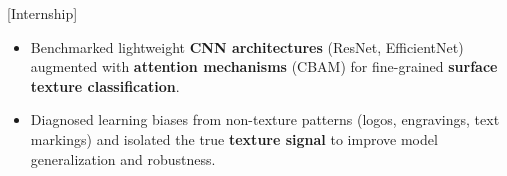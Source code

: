 [Internship]
\begin{itemize}
\item Benchmarked lightweight \textbf{CNN architectures} (ResNet, EfficientNet) augmented with \textbf{attention mechanisms} (CBAM) for fine-grained \textbf{surface texture classification}.
\item Diagnosed learning biases from non-texture patterns (logos, engravings, text markings) and isolated the true \textbf{texture signal} to improve model generalization and robustness.
\end{itemize}

{\LaTeXraggedright
{}
\par}
